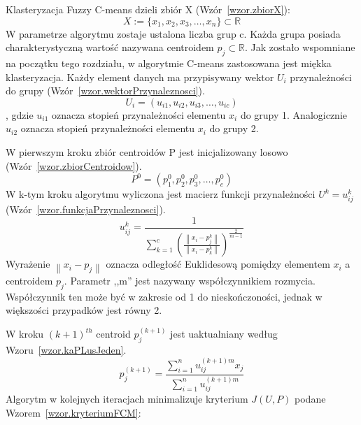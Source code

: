 \documentclass[a4paper,twoside,12pt]{book}
\begin{document}
    Klasteryzacja Fuzzy C-means dzieli zbiór X (Wzór~\ref{wzor.zbiorX}):
    \large
    \begin{equation}
        X:=\{x_{1},x_{2},x_{3},\ldots,x_{n}\}\subset \mathbb{R}
        \label{wzor.zbiorX}
    \end{equation}
    \normalsize
    W parametrze algorytmu zostaje ustalona liczba grup c.
    Każda grupa posiada charakterystyczną wartość nazywana centroidem $p_{j}\subset \mathbb{R}$.
    Jak zostało wspomniane na początku tego rozdziału, w algorytmie C-means zastosowana jest miękka klasteryzacja.
    Każdy element danych ma przypisywany wektor $U_{i}$ przynależności do grupy (Wzór~\ref{wzor.wektorPrzynaleznosci}).
    \large
    \begin{equation}
        U_{i}=(u_{i1}, u_{i2}, u_{i3}, \ldots, u_{ic})
        \label{wzor.wektorPrzynaleznosci}
    \end{equation}
    \normalsize
    , gdzie $u_{i1}$ oznacza stopień przynależności elementu $x_{i}$ do grupy 1.
    Analogicznie $u_{i2}$ oznacza stopień przynależności elementu $x_{i}$ do grupy 2.

    W pierwszym kroku zbiór centroidów P jest inicjalizowany losowo (Wzór~\ref{wzor.zbiorCentroidow}).
    \large
    \begin{equation}
        P^{0}=(p_{1}^{0}, p_{2}^{0}, p_{3}^{0}, \ldots, p_{c}^{0})
        \label{wzor.zbiorCentroidow}
    \end{equation}
    \normalsize
    W k-tym kroku algorytmu wyliczona jest macierz funkcji przynależności $U^{k} = {u_{ij}^{k}}$ (Wzór~\ref{wzor.funkcjaPrzynaleznosci}).
    \large
    \begin{equation}
        u_{ij}^{k} = \frac{1}{\sum_{k=1}^{c}\left ( \frac{\left \| x_{i} - p_{j}^{k} \right \|}{\left \|x_{i} - p_{k}^{k}  \right \|} \right )^{\frac{2}{m-1}}}
        \label{wzor.funkcjaPrzynaleznosci}
    \end{equation}
    \normalsize
    Wyrażenie $\left \| x_{i} - p_{j} \right \|$ oznacza odległość Euklidesową pomiędzy elementem $x_{i}$ a
    centroidem $p_{j}$. Parametr ,,m'' jest nazywany współczynnikiem rozmycia. Współczynnik ten może być w zakresie
    od 1 do nieskończoności, jednak w większości przypadków jest równy 2.

    W kroku $(k+1)^{th}$ centroid $p_{j}^{(k+1)}$ jest uaktualniany według Wzoru~\ref{wzor.kaPLusJeden}.
    \large
    \begin{equation}
        p_{j}^{(k+1)}=\frac{\sum_{i=1}^{n}u_{ij}^{(k+1)m}x_{j}}{\sum_{i=1}^{n}u_{ij}^{(k+1)m}}
        \label{wzor.kaPLusJeden}
    \end{equation}
    \normalsize
    Algorytm w kolejnych iteracjach minimalizuje kryterium $J(U,P)$ podane Wzorem~\ref{wzor.kryteriumFCM}:
\end{document}
